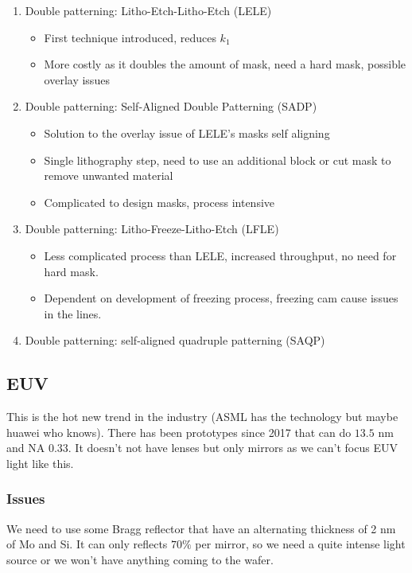 \documentclass{report}
\begin{document}
\begin{enumerate}
    \item Double patterning: Litho-Etch-Litho-Etch (LELE)
    \begin{itemize}
        \item First technique introduced, reduces $k_1$
        \item More costly as it doubles the amount of mask, need a hard mask, possible overlay issues
    \end{itemize}
    \item Double patterning: Self-Aligned Double Patterning (SADP)
    \begin{itemize}
        \item Solution to the overlay issue of LELE's masks self aligning
        \item Single lithography step, need to use an additional block or cut mask to remove unwanted material
        \item Complicated to design masks, process intensive
    \end{itemize}
    \item Double patterning: Litho-Freeze-Litho-Etch (LFLE)
    \begin{itemize}
        \item Less complicated process than LELE, increased throughput, no need for hard mask.
        \item Dependent on development of freezing process, freezing cam cause issues in the lines.
    \end{itemize}
    \item Double patterning: self-aligned quadruple patterning (SAQP)
\end{enumerate}

\subsection{EUV}

This is the hot new trend in the industry (ASML has the technology but maybe huawei who knows). There has been prototypes since 2017 that can do $13.5$ nm and NA $0.33$. It doesn't not have lenses but only mirrors as we can't focus EUV light like this.

\subsubsection{Issues}

We need to use some Bragg reflector that have an alternating thickness of 2 nm of Mo and Si. It can only reflects $70\%$  per mirror, so we need a quite intense light source or we won't have anything coming to the wafer.
\end{document}
